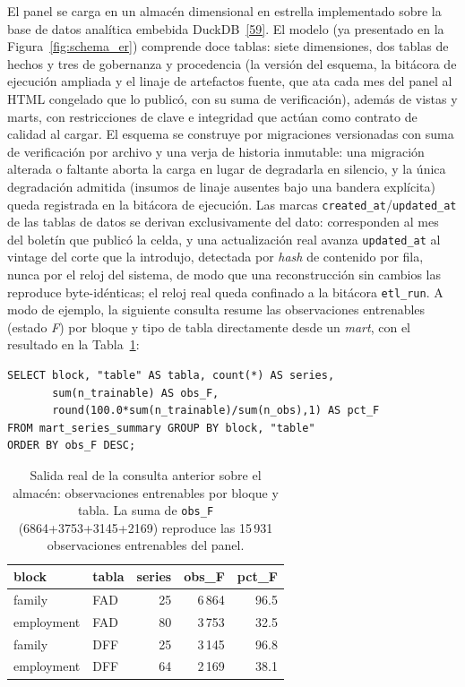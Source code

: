 \documentclass[12pt,letterpaper]{report}
\newcommand{\cita}[1]{\hyperref[bib:#1]{[#1]}}
\begin{document}
El panel se carga en un almac\'en dimensional en estrella implementado sobre la base de
datos anal\'itica embebida DuckDB~\cita{59}. El modelo (ya presentado en la
Figura~\ref{fig:schema_er}) comprende doce tablas: siete dimensiones, dos tablas de
hechos y tres de gobernanza y procedencia (la versi\'on del esquema, la bit\'acora de
ejecuci\'on ampliada y el linaje de artefactos fuente, que ata cada mes del panel al
HTML congelado que lo public\'o, con su suma de verificaci\'on), adem\'as de vistas y
marts, con restricciones de clave e integridad que act\'uan como contrato de calidad al
cargar. El esquema se construye por migraciones versionadas con suma de verificaci\'on
por archivo y una verja de historia inmutable: una migraci\'on alterada o faltante
aborta la carga en lugar de degradarla en silencio, y la \'unica degradaci\'on admitida
(insumos de linaje ausentes bajo una bandera expl\'icita) queda registrada en la
bit\'acora de ejecuci\'on. Las marcas \texttt{created\_at}/\texttt{updated\_at} de las
tablas de datos se derivan exclusivamente del dato: corresponden al mes del bolet\'in
que public\'o la celda, y una actualizaci\'on real avanza \texttt{updated\_at} al
vintage del corte que la introdujo, detectada por \textit{hash} de contenido por fila,
nunca por el reloj del sistema, de modo que una reconstrucci\'on sin cambios las
reproduce byte-id\'enticas; el reloj real queda confinado a la bit\'acora
\texttt{etl\_run}. A modo de ejemplo, la siguiente consulta resume las observaciones
entrenables (estado \textit{F}) por bloque y tipo de tabla directamente desde un \textit{mart},
con el resultado en la Tabla~\ref{tab:duckdb_query}:

\begin{verbatim}
SELECT block, "table" AS tabla, count(*) AS series,
       sum(n_trainable) AS obs_F,
       round(100.0*sum(n_trainable)/sum(n_obs),1) AS pct_F
FROM mart_series_summary GROUP BY block, "table"
ORDER BY obs_F DESC;
\end{verbatim}

\begin{table}[H]
\centering
\footnotesize
\caption[Resultado de la consulta de resumen]{Salida real de la consulta anterior sobre el
almac\'en: observaciones entrenables por bloque y tabla. La suma de \texttt{obs\_F}
(6864+3753+3145+2169) reproduce las 15\,931 observaciones entrenables del panel.}
\label{tab:duckdb_query}
\begin{tabular}{@{}l l r r r@{}}
\toprule
\rowcolor{uacjblue!15}
\textbf{block} & \textbf{tabla} & \textbf{series} & \textbf{obs\_F} & \textbf{pct\_F} \\ \midrule
family     & FAD & 25 & 6\,864 & 96.5 \\
employment & FAD & 80 & 3\,753 & 32.5 \\
family     & DFF & 25 & 3\,145 & 96.8 \\
employment & DFF & 64 & 2\,169 & 38.1 \\
\bottomrule
\end{tabular}
\end{table}
\end{document}
